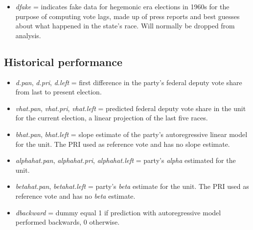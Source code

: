 \documentclass[11pt]{article}
\begin{document}
\begin{itemize}
\item \emph{dfake} = indicates fake data for hegemonic era elections in 1960s for the purpose of computing vote lags, made up of press reports and best guesses about what happened in the state's race. Will normally be dropped from analysis.
\end{itemize}
\subsection{Historical performance}
\label{sec:orgb08d9e4}
\begin{itemize}
\item \emph{d.pan}, \emph{d.pri}, \emph{d.left} = first difference in the party's federal deputy vote share from last to present election.
\item \emph{vhat.pan}, \emph{vhat.pri}, \emph{vhat.left} = predicted federal deputy vote share in the unit for the current election, a linear projection of the last five races.
\item \emph{bhat.pan}, \emph{bhat.left} = slope estimate of the party's autoregressive linear model for the unit. The PRI used as reference vote and has no slope estimate.
\item \emph{alphahat.pan}, \emph{alphahat.pri}, \emph{alphahat.left} = party's \emph{alpha} estimated for the unit.
\item \emph{betahat.pan}, \emph{betahat.left} = party's \emph{beta} estimate for the unit. The PRI used as reference vote and has no \emph{beta} estimate.
\item \emph{dbackward} = dummy equal 1 if prediction with autoregressive model performed backwards, 0 otherwise.
\end{itemize}
\end{document}
